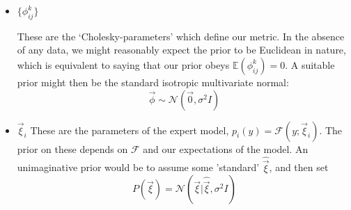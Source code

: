 \begin{itemize}
            \item $\{\phi_{ij}^k\}$
            
            These are the `Cholesky-parameters' which define our metric. In the absence of any data, we might reasonably expect the prior to be Euclidean in nature, which is equivalent to saying that our prior obeys $\mathbb{E}(\phi_{ij}^k) = 0$. A suitable prior might then be the standard isotropic multivariate normal:
            \begin{equation}
                \vec{\phi} \sim \mathcal{N}(\vec{0},\sigma^2 I)
            \end{equation}

            \item $\vec{\xi}_i$ These are the parameters of the expert model, $p_i(y) = \mathcal{F}(y; \vec{\xi}_i)$. The prior on these depends on $\mathcal{F}$ and our expectations of the model. An unimaginative prior would be to assume some 'standard' $\hat{\vec{\xi}}$, and then set
            \begin{equation}
                P(\vec{\xi}) = \mathcal{N}(\vec{\xi} | \hat{\vec{\xi}},\sigma^2I)
            \end{equation}
        \end{itemize}
        